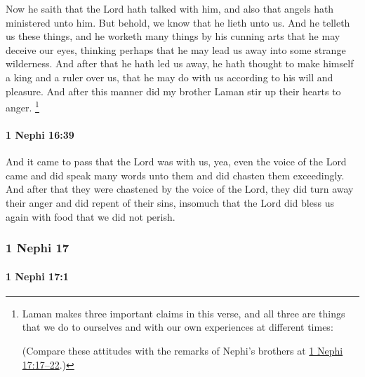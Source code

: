 			Now he saith that the Lord hath talked with him,
			and also that angels hath ministered unto him.
			But behold, we know that he lieth unto us.
			And he telleth us these things,
			and he worketh many things by his cunning arts
			that he may deceive our eyes,
			thinking perhaps that he may lead us away into some strange wilderness.
			And after that he hath led us away,
			he hath thought to make himself a king and a ruler over us,
			that he may do with us according to his will and pleasure.
			And after this manner did my brother Laman stir up their hearts to anger.%
				\footnote{%
					\label{1NEPHI-16-38-NOTE-lies}%
					Laman makes three important claims in this verse, and all three are things that we do to ourselves and with our own experiences at different times:
					\begin{compactdesc}
						\item[\#1: Openly deny past experiences]
						\item[\#2: Explain past experiences away]
						\item[\#3: Create a false narrative to reframe the present and future]
					\end{compactdesc}
					(Compare these attitudes with the remarks of Nephi's brothers at \hyperref[1NEPHI-17-17]{1 Nephi 17:17--22}.)
					}

		\paragraph{1 Nephi 16:39} %
			\label{1NEPHI-16-39}

			And it came to pass that the Lord was with us,
			yea, even the voice of the Lord came and did speak many words unto them
			and did chasten them exceedingly.
			And after that they were chastened by the voice of the Lord,
			they did turn away their anger and did repent of their sins,
			insomuch that the Lord did bless us again with food that we did not perish.

	\subsubsection{1 Nephi 17} %
		\label{1NEPHI-17}
		
		\paragraph{1 Nephi 17:1} %
			\label{1NEPHI-17-1}

